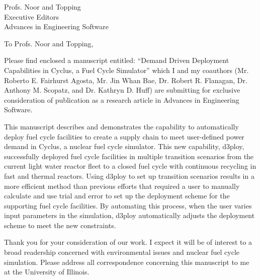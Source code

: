 \documentclass[11pt]{letter} %
\newcommand{\RecipientName}{Profs. Noor and Topping\xspace}
\newcommand{\RecipientAddress}{Executive Editors\\Advances in Engineering Software}
\begin{document}
\small
\begin{letter}{\RecipientName\\
        \RecipientAddress\xspace}

\address{Gwendolyn J. Chee\\
gchee2@illinois.edu\\
226 Talbot Laboratory\\
104 Wright Street, MC-234\\
Urbana, IL 61801}


\opening{To \RecipientName,}

Please find enclosed a manuscript entitled: ``Demand Driven Deployment Capabilities in Cyclus, 
a Fuel Cycle Simulator'' which I and my 
coauthors (Mr. Roberto E. Fairhurst Agosta, Mr. Jin Whan Bae, 
Dr. Robert R. Flanagan, Dr. Anthony M. Scopatz, and Dr. Kathryn D. Huff) are submitting for 
exclusive consideration of publication as a research article in Advances in Engineering Software. 

This manuscript describes and demonstrates the capability to automatically deploy fuel cycle 
facilities to create a supply chain to meet user-defined power demand in Cyclus, 
a nuclear fuel cycle simulator.
This new capability, d3ploy, successfully deployed fuel cycle facilities in
multiple transition scenarios from the current light water reactor 
fleet to a closed fuel cycle with continuous recycling in fast and thermal reactors.
Using d3ploy to set up transition scenarios results in a more
efficient method than previous efforts that required a user to manually calculate
and use trial and error to set up the deployment scheme for the supporting
fuel cycle facilities. By automating this process, when the user varies input
parameters in the simulation, d3ploy automatically adjusts the deployment
scheme to meet the new constraints.

Thank you for your consideration of our work.  I expect it will be of interest
to a broad readership concerned with environmental issues and nuclear fuel
cycle simulation.  Please address all correspondence concerning this manuscript to me at the University of Illinois.




\end{letter}
\end{document}

